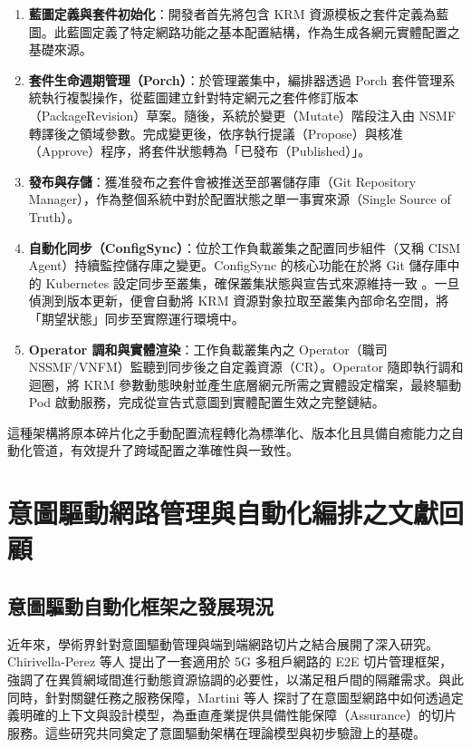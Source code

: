\begin{enumerate}
\item \textbf{藍圖定義與套件初始化}：開發者首先將包含 KRM 資源模板之套件定義為藍圖。此藍圖定義了特定網路功能之基本配置結構，作為生成各網元實體配置之基礎來源。
\item \textbf{套件生命週期管理（Porch）}：於管理叢集中，編排器透過 Porch 套件管理系統執行複製操作，從藍圖建立針對特定網元之套件修訂版本（PackageRevision）草案。隨後，系統於變更（Mutate）階段注入由 NSMF 轉譯後之領域參數。完成變更後，依序執行提議（Propose）與核准（Approve）程序，將套件狀態轉為「已發布（Published）」。
\item \textbf{發布與存儲}：獲准發布之套件會被推送至部署儲存庫（Git Repository Manager），作為整個系統中對於配置狀態之單一事實來源（Single Source of Truth）。
\item \textbf{自動化同步（ConfigSync）}：位於工作負載叢集之配置同步組件（又稱 CISM Agent）持續監控儲存庫之變更。ConfigSync 的核心功能在於將 Git 儲存庫中的 Kubernetes 設定同步至叢集，確保叢集狀態與宣告式來源維持一致 \cite{google_config_sync}。一旦偵測到版本更新，便會自動將 KRM 資源對象拉取至叢集內部命名空間，將「期望狀態」同步至實際運行環境中。
\item \textbf{Operator 調和與實體渲染}：工作負載叢集內之 Operator（職司 NSSMF/VNFM）監聽到同步後之自定義資源（CR）。Operator 隨即執行調和迴圈，將 KRM 參數動態映射並產生底層網元所需之實體設定檔案，最終驅動 Pod 啟動服務，完成從宣告式意圖到實體配置生效之完整鏈結。
\end{enumerate}

這種架構將原本碎片化之手動配置流程轉化為標準化、版本化且具備自癒能力之自動化管道，有效提升了跨域配置之準確性與一致性。

\section{意圖驅動網路管理與自動化編排之文獻回顧}

\subsection{意圖驅動自動化框架之發展現況}
近年來，學術界針對意圖驅動管理與端到端網路切片之結合展開了深入研究。Chirivella-Perez 等人 \cite{chirivella2023e2e} 提出了一套適用於 5G 多租戶網路的 E2E 切片管理框架，強調了在異質網域間進行動態資源協調的必要性，以滿足租戶間的隔離需求。與此同時，針對關鍵任務之服務保障，Martini 等人 \cite{martini2023intent} 探討了在意圖型網路中如何透過定義明確的上下文與設計模型，為垂直產業提供具備性能保障（Assurance）的切片服務。這些研究共同奠定了意圖驅動架構在理論模型與初步驗證上的基礎。

